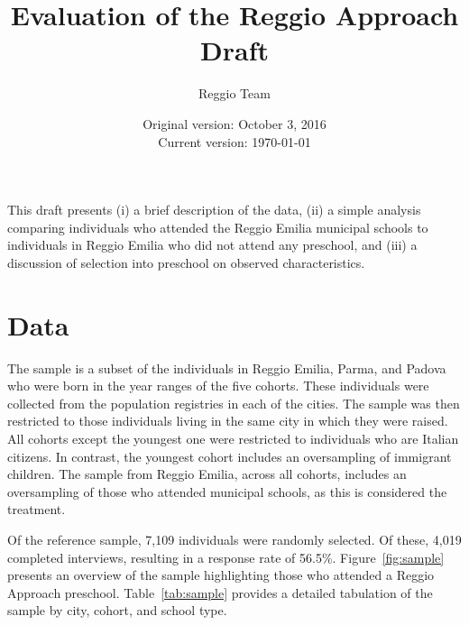 


\usepackage{sectsty}
\sectionfont{\fontsize{14}{14}\selectfont}
\subsectionfont{\fontsize{13}{13}\selectfont}



\title{\normalsize \textbf{Evaluation of the Reggio Approach} \\ \normalsize Draft}
\author{\normalsize Reggio Team}
\date{\normalsize Original version: October 3, 2016 \\ Current version: \today}
\maketitle

\doublespacing

This draft presents (i) a brief description of the data, (ii) a simple analysis comparing individuals who attended the Reggio Emilia municipal schools to individuals in Reggio Emilia who did not attend any preschool, and (iii) a discussion of selection into preschool on observed characteristics. 

\section{Data}
\label{sec:data}

The sample is a subset of the individuals in Reggio Emilia, Parma, and Padova who were born in the year ranges of the five cohorts.  These individuals were collected from the population registries in each of the cities. The sample was then restricted to those individuals living in the same city in which they were raised. All cohorts except the youngest one were restricted to individuals who are Italian citizens. In contrast, the youngest cohort includes an oversampling of immigrant children. The sample from Reggio Emilia, across all cohorts, includes an oversampling of those who attended municipal schools, as this is considered the treatment.

Of the reference sample, 7,109 individuals were randomly selected. Of these, 4,019 completed interviews, resulting in a response rate of 56.5\%. Figure~\ref{fig:sample} presents an overview of the sample highlighting those who attended a Reggio Approach preschool. Table~\ref{tab:sample} provides a detailed tabulation of the sample by city, cohort, and school type.

